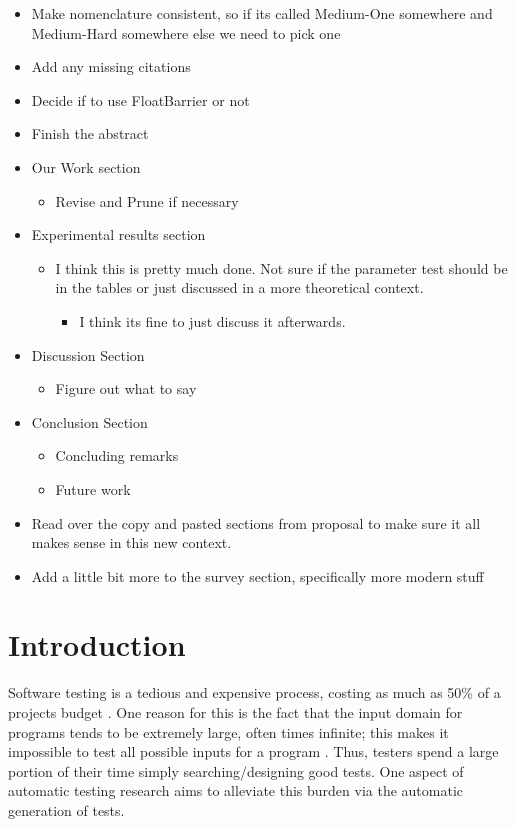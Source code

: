 \documentclass[runningheads]{llncs}
\begin{document}
\begin{itemize}
\item Make nomenclature consistent, so if its called Medium-One somewhere and Medium-Hard somewhere else we need to pick one
\item Add any missing citations
\item Decide if to use FloatBarrier or not
\item Finish the abstract
\item Our Work section
     \begin{itemize}
     \item Revise and Prune if necessary
     \end{itemize}
\item Experimental results section
     \begin{itemize}
     \item I think this is pretty much done. Not sure if the parameter test should be in the tables
	     or just discussed in a more theoretical context.
	     \begin{itemize}
          \item I think its fine to just discuss it afterwards.
         \end{itemize}
     \end{itemize}
\item Discussion Section
     \begin{itemize}
     \item Figure out what to say
     \end{itemize}
\item Conclusion Section
     \begin{itemize}
     \item Concluding remarks
     \item Future work
     \end{itemize}
\item Read over the copy and pasted sections from proposal to make sure it all makes sense in this new context.
\item Add a little bit more to the survey section, specifically more modern stuff
\end{itemize}

\section{Introduction}
Software testing is a tedious and expensive process, costing as much as 50\% of a projects budget \cite{meyers1}. One reason for this is the fact that the input domain for programs tends to be extremely large, often times infinite; this makes it impossible to test all possible inputs for a program \cite{meyers1}. Thus, testers spend a large portion of their time simply searching/designing good tests. One aspect of automatic testing research aims to alleviate this burden via the automatic generation of tests.
\end{document}

